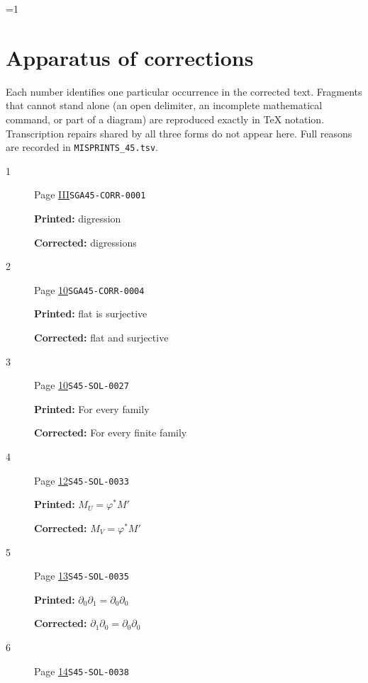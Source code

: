 \documentclass[oneside]{book}
\theoremstyle{sga-source}
\theoremstyle{sga-source-dash}
\theoremstyle{sga-source-dotdash}
\theoremstyle{sga-source-number-note-dash}
\theoremstyle{sga-source-note-number-dotdash}
\theoremstyle{sga-source-example-dotdash}
\theoremstyle{sga-source-inline-number}
\theoremstyle{sga-source-bare-number}
\theoremstyle{sga-source}
\providecommand\EditionMode{0}
\begin{document}
\ifnum\EditionMode=1\relax
\clearpage
\chapter*{Apparatus of corrections}
Each number identifies one particular occurrence in the corrected text. Fragments that cannot stand alone (an open delimiter, an incomplete mathematical command, or part of a diagram) are reproduced exactly in TeX notation. Transcription repairs shared by all three forms do not appear here. Full reasons are recorded in \texttt{MISPRINTS\_45.tsv}.
\begingroup\small
\begin{description}
\item[\hypertarget{apparatus:EN-0001}{1}] Page \hyperlink{printpage:en:III}{III}\quad\texttt{SGA45-CORR-0001}
\par\noindent\textbf{Printed:} digression
\par\noindent\textbf{Corrected:} digressions
\smallskip
\item[\hypertarget{apparatus:EN-0002}{2}] Page \hyperlink{printpage:en:10}{10}\quad\texttt{SGA45-CORR-0004}
\par\noindent\textbf{Printed:} flat is surjective
\par\noindent\textbf{Corrected:} flat and surjective
\smallskip
\item[\hypertarget{apparatus:EN-0003}{3}] Page \hyperlink{printpage:en:10}{10}\quad\texttt{S45-SOL-0027}
\par\noindent\textbf{Printed:} For every family
\par\noindent\textbf{Corrected:} For every finite family
\smallskip
\item[\hypertarget{apparatus:EN-0004}{4}] Page \hyperlink{printpage:en:12}{12}\quad\texttt{S45-SOL-0033}
\par\noindent\textbf{Printed:} \(M_U=\varphi^*M'\)
\par\noindent\textbf{Corrected:} \(M_V=\varphi^*M'\)
\smallskip
\item[\hypertarget{apparatus:EN-0005}{5}] Page \hyperlink{printpage:en:13}{13}\quad\texttt{S45-SOL-0035}
\par\noindent\textbf{Printed:} \(\partial_0\partial_1=\partial_0\partial_0\)
\par\noindent\textbf{Corrected:} \(\partial_1\partial_0=\partial_0\partial_0\)
\smallskip
\item[\hypertarget{apparatus:EN-0006}{6}] Page \hyperlink{printpage:en:14}{14}\quad\texttt{S45-SOL-0038}

\end{description}
\end{document}
